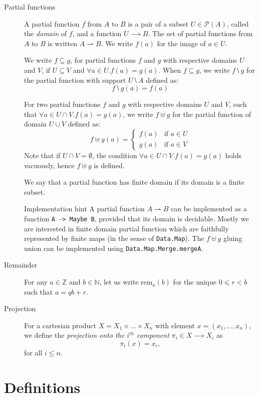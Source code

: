 \documentclass{article}
\newenvironment{implementationhint}{\begin{bclogo}[noborder=true,
    logo=\bccrayon, epBarre=3, couleurBarre=PineGreen]{Implementation hint}}{\end{bclogo}}
\newcommand{\powerset}[1]{\mathcal{P}(#1)}
\newcommand{\rem}[2]{\mathrm{rem}_{#1}(#2)}
\begin{document}
\begin{description}
\item[Partial functions] A partial function $f$ from $A$ to $B$ is a
  pair of a subset $U∈\powerset{A}$, called the \emph{domain} of $f$,
  and a function $U⟶B$. The set of partial functions from $A$ to $B$
  is written $A ⇀ B$. We write $f(a)$ for the image of $a∈U$.

  We write $f⊆g$, for partial functions $f$ and $g$ with respective domains $U$
  and $V$, if $U ⊆ V$ and $∀a∈U. f(a)=g(a)$. When $f⊆g$, we write
  $f⧵g$ for the partial function with support $U⧵A $ defined as:
  $$
  f⧵g(a) = f(a)
  $$

  For two partial functions $f$ and $g$ with respective domains $U$
  and $V$, such that $∀a∈U∩V. f(a)=g(a)$, we write $f⊎g$ for the partial function
  of domain $U∪V$ defined as:
  $$
  f⊎g(a) = \left\{
    \begin{array}{ll}
      f(a) & \mbox{if }a∈U\\
      g(a) & \mbox{if }a∈V
    \end{array}
    \right.
  $$
  Note that if $U∩V=∅$, the condition $∀a∈U∩V. f(a)=g(a)$ holds
  vacuously, hence $f⊎g$ is defined.

  We say that a partial function has finite domain if its domain is
  a finite subset.

  \begin{implementationhint}
    A partial function $A⇀B$ can be implemented as a function
    \verb+A -> Maybe B+, provided that its domain is decidable. Mostly we are
    interested in finite domain partial function which are faithfully
    represented by finite maps (in the sense of \verb+Data.Map+). The $f⊎g$
    gluing union can be implemented using \verb+Data.Map.Merge.mergeA+.
  \end{implementationhint}


\item[Remainder] For any $a∈ℤ$ and $b∈ℕ$, let us write $\rem{a}{b}$
  for the unique $0⩽r<b$ such that $a=qb+r$.

\item[Projection] For a cartesian product $X=X_1×…× X_n$ with element $x =
  (x_1, \dots, x_n)$, we define the \textit{projection onto the $i^{th}$ component}
  $\pi_i∈X⟶X_i$ as \[\pi_i(x)=x_i,\] for all $i \leq n$.
\end{description}

\section{Definitions}
\label{sec:definitions}
\end{document}

